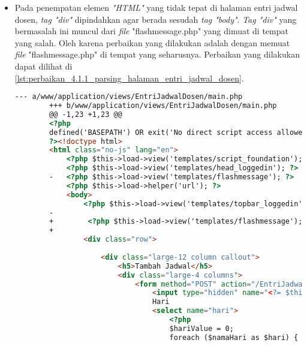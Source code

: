 \begin{itemize}
    \item Pada penempatan elemen \textit{"HTML"} yang tidak tepat di halaman entri jadwal dosen, \textit{tag "div"} dipindahkan agar berada sesudah \textit{tag "body"}. \textit{Tag "div"} yang bermasalah ini muncul dari \textit{file} "flashmessage.php" yang dimuat di tempat yang salah. Oleh karena perbaikan yang dilakukan adalah dengan memuat \textit{file} "flashmessage.php" di tempat yang seharusnya. Perbaikan yang dilakukan dapat dilihat di \ref{lst:perbaikan_4.1.1_parsing_halaman_entri_jadwal_dosen}.
    \begin{lstlisting}[frame=single, label={lst:perbaikan_4.1.1_parsing_halaman_entri_jadwal_dosen}, language=HTML, caption=Perbaikan Kriteria Sukses 4.1.1 - Kesalahan Elemen pada Halaman Entri Jadwal Dosen]
        --- a/www/application/views/EntriJadwalDosen/main.php
        +++ b/www/application/views/EntriJadwalDosen/main.php
        @@ -1,23 +1,23 @@
        <?php
        defined('BASEPATH') OR exit('No direct script access allowed');
        ?><!doctype html>
        <html class="no-js" lang="en">
            <?php $this->load->view('templates/script_foundation'); ?>
            <?php $this->load->view('templates/head_loggedin'); ?>
        -	<?php $this->load->view('templates/flashmessage'); ?>
            <?php $this->load->helper('url'); ?>
            <body>
                <?php $this->load->view('templates/topbar_loggedin'); ?>
        -
        +        <?php $this->load->view('templates/flashmessage'); ?>
        +        
                <div class="row">
        
                    <div class="large-12 column callout">
                        <h5>Tambah Jadwal</h5>
                        <div class="large-4 columns">
                            <form method="POST" action="/EntriJadwalDosen/add">
                                <input type="hidden" name="<?= $this->security->get_csrf_token_name() ?>" value="<?= $this->security->get_csrf_hash() ?>" />
                                Hari
                                <select name="hari">  
                                    <?php
                                    $hariValue = 0;
                                    foreach ($namaHari as $hari) {
    \end{lstlisting} 
\end{itemize}